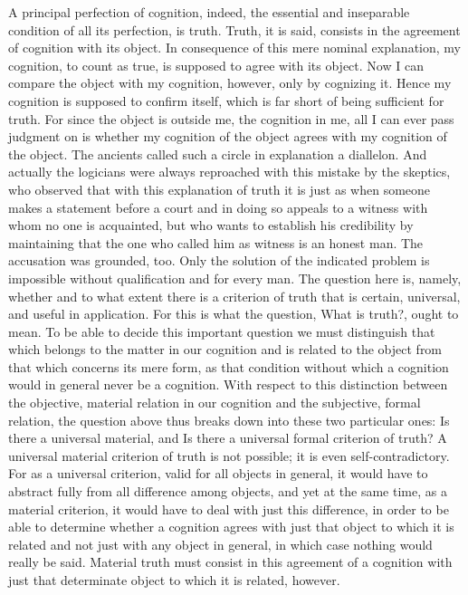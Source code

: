 A principal perfection of cognition, indeed,
the essential and inseparable condition of all its perfection, is truth.
Truth, it is said, consists in the agreement of cognition with its object.
In consequence of this mere nominal explanation, my cognition,
to count as true, is supposed to agree with its object.
Now I can compare the object with my cognition, however,
only by cognizing it.
Hence my cognition is supposed to confirm itself,
which is far short of being sufficient for truth.
For since the object is outside me, the cognition in me,
all I can ever pass judgment on is whether
my cognition of the object agrees with my cognition of the object.
The ancients called such a circle in explanation a diallelon.
And actually the logicians were always reproached with this mistake by the skeptics, who
observed that with this explanation of truth it is just as when someone
makes a statement before a court and in doing so appeals to a witness with
whom no one is acquainted, but who wants to establish his credibility by
maintaining that the one who called him as witness is an honest man.
The accusation was grounded, too.
Only the solution of the indicated problem
is impossible without qualification and for every man.
The question here is, namely, whether and to what extent there is a
criterion of truth that is certain, universal, and useful in application.
For this is what the question, What is truth?, ought to mean.
To be able to decide this important question we must distinguish that
which belongs to the matter in our cognition and is related to the object
from that which concerns its mere form, as that condition without which a
cognition would in general never be a cognition. With respect to this
distinction between the objective, material relation in our cognition and the
subjective, formal relation, the question above thus breaks down into these
two particular ones:
Is there a universal material, and
Is there a universal formal criterion of truth?
A universal material criterion of truth is not possible;
it is even self-contradictory.
For as a universal criterion, valid for all objects in general, it
would have to abstract fully from all difference among objects, and yet at
the same time, as a material criterion, it would have to deal with just this
difference, in order to be able to determine whether a cognition agrees
with just that object to which it is related and not just with any object in
general, in which case nothing would really be said.
Material truth must consist in this agreement of a cognition with just that determinate object
to which it is related, however.
